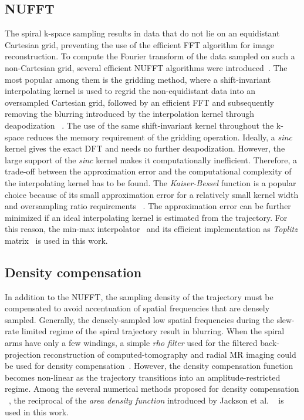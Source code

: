 \subsection{NUFFT}
The spiral k-space sampling results in data that do not lie on an equidistant Cartesian grid, preventing the use of the efficient \gls{FFT} algorithm for image reconstruction. To compute the Fourier transform of the data sampled on such a non-Cartesian grid, several efficient \gls{NUFFT} algorithms were introduced~\cite{duttFastFourierTransforms1993}. The most popular among them is the gridding method, where a shift-invariant interpolating kernel is used to regrid the non-equidistant data into an oversampled Cartesian grid, followed by an efficient \gls{FFT} and subsequently removing the blurring introduced by the interpolation kernel through deapodization ~\cite{jacksonSelectionConvolutionFunction1991}. The use of the same shift-invariant kernel throughout the k-space reduces the memory requirement of the gridding operation. Ideally, a \emph{sinc} kernel gives the exact \gls{DFT} and needs no further deapodization. However, the large support of the \emph{sinc} kernel makes it computationally inefficient. Therefore, a trade-off between the approximation error and the computational complexity of the interpolating kernel has to be found. The \emph{Kaiser-Bessel} function is a popular choice because of its small approximation error for a relatively small kernel width and oversampling ratio requirements ~\cite{beattyRapidGriddingReconstruction2005}. The approximation error can be further minimized if an ideal interpolating kernel is estimated from the trajectory. For this reason, the min-max interpolator~\cite{fesslerNonuniformFastFourier2003} and its efficient implementation as \emph{Toplitz} matrix~\cite{fesslerToeplitzbasedIterativeImage2005} is used in this work.

\subsection{Density compensation}
\label{sec:DCF}
In addition to the \gls{NUFFT}, the sampling density of the trajectory must be compensated to avoid accentuation of spatial frequencies that are densely sampled. Generally, the densely-sampled low spatial frequencies during the slew-rate limited regime of the spiral trajectory result in blurring. When the spiral arms have only a few windings, a simple \emph{rho filter} used for the filtered back-projection reconstruction of computed-tomography and radial MR imaging could be used for density compensation~\cite{matsuoThreedimensionalImageReconstruction1993}. However, the density compensation function becomes non-linear as the trajectory transitions into an amplitude-restricted regime. Among the several numerical methods proposed for density compensation ~\cite{hogeDensityCompensationFunctions1997,pipeSamplingDensityCompensation1999,malikGriddingAlgorithmEfficient2005}, the reciprocal of the \emph{area density function} introduced by Jackson et al. ~\cite{jacksonSelectionConvolutionFunction1991} is used in this work.      

